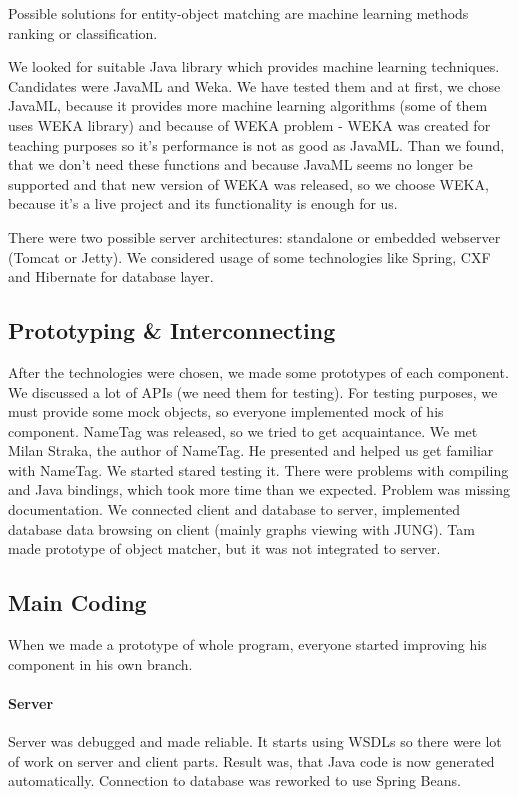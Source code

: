 Possible solutions for entity-object matching are machine learning  methods
ranking or classification.

We looked for suitable Java library which provides machine learning techniques.
Candidates were JavaML and Weka. We have tested them and at first, we chose
JavaML, because it provides more machine learning algorithms (some of them uses
WEKA library) and because of WEKA problem - WEKA  was created for teaching purposes so
it's performance is not as good as JavaML.
Than we found, that we don't need these functions and because JavaML seems no longer
be supported and that
new version of WEKA was released, so we choose WEKA, because it's a live project
and its functionality is enough for us.

There were two possible server architectures: standalone or embedded webserver
(Tomcat or Jetty). We considered usage of some technologies like Spring, CXF and
Hibernate for database layer.

\subsection{Prototyping \& Interconnecting}
After the technologies were chosen, we made some prototypes of each component. We
discussed a lot of APIs (we need them for testing). For testing purposes, we must
provide some mock objects, so everyone implemented mock of his component.
NameTag was released, so we tried to get acquaintance. We met Milan Straka, the author of NameTag.
He presented and helped us get familiar with NameTag. We started stared testing it.
There were problems with compiling and Java bindings, which took more time than 
we expected. Problem was missing documentation.
We connected client and database to server, implemented database data browsing
on client (mainly graphs viewing with JUNG).
Tam made prototype of object matcher, but it was not integrated to server.

\subsection{Main Coding}
When we made a prototype of whole program, everyone started improving his component
in his own branch.
\paragraph{Server} Server was debugged and made reliable. It starts using WSDLs 
so there were lot of work on server and client parts. Result was, that Java code
 is now generated automatically. Connection to database was reworked to use Spring Beans.
